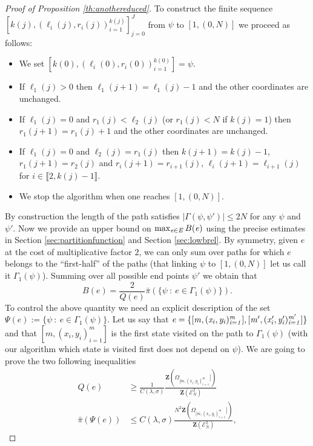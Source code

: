 \documentclass[reqno,11pt]{amsart}
\numberwithin{equation}{section}
\newcommand{\gG}{\Gamma}
\newcommand{\gO}{\Omega}
\newcommand{\gl}{\lambda}
\newcommand{\gs}{\sigma}
\newcommand{\cE}{{\ensuremath{\mathcal E}} }
\newcommand{\bZ}{{\ensuremath{\mathbf Z}} }
\newcommand{\lint}{\llbracket}
\newcommand{\rint}{\rrbracket}
\begin{document}
\begin{proof}[Proof of Proposition \ref{th:anothereduced}]
\medskip

To construct the finite sequence  $[k(j), (\ell_i(j),r_i(j))_{i=1}^{k(j)}]_{j=0}^{J}$ from $\psi$ to $[1,(0,N)]$ we proceed as follows:
\begin{itemize}
\item We set $[k(0), (\ell_i(0),r_i(0))^{k(0)}_{i=1}]= \psi$.
 \item If $\ell_1(j)>0$ then $\ell_1(j+1)= \ell_1(j)-1$ and the other coordinates are unchanged.
 \item If $\ell_1(j)=0$ and $r_1(j)<\ell_2(j)$ (or $r_1(j)<N$ if $k(j)=1$) then $r_1(j+1)=r_1(j)+1$ and the other coordinates are unchanged.
 \item If $\ell_1(j)=0$ and $\ell_2(j)=r_1(j)$ then $k(j+1)=k(j)-1$, $r_1(j+1)=r_2(j)$
 and $r_{i}(j+1)=r_{i+1}(j)$,  $\ell_{i}(j+1)=\ell_{i+1}(j)$ for $i \in \lint 2, k(j)-1\rint$.
 \item We stop the algorithm when one reaches $[1,(0,N)]$.
\end{itemize}
By construction the length of the path satisfies $| \gG(\psi,\psi') |\le 2N$ for any $\psi$ and $\psi'$.
Now we provide an upper bound on $\max_{\it e \in \it E} B(\it e)$ using the precise estimates in Section \ref{sec:partitionfunction} and Section \ref{sec:lowbrel}. By symmetry, given $e$ at the cost of  multiplicative factor $2$, we can only sum over paths for which $e$ belongs to the ``first-half'' of the paths (that linking $\psi$ to  $[1,(0,N)]$ let us call it $\gG_1(\psi)$).
Summing over all possible end points  $\psi'$  we obtain that 
\begin{equation}
 B(e)= \frac{2}{Q(e)} \bar \pi \left( \{\psi  \ :  \ e \in \Gamma_1(\psi)\} \right).
\end{equation}
To control the above quantity we need an explicit description of the set $\Psi(e):=\{\psi  \ :  \ e \in \Gamma_1(\psi)\}$.
Let us say that 
 $\it e= \{[m, (x_i,y_i)^m_{i=1}], [m', (x'_i,y'_i)^{m'}_{i=1}]\}$
 and that $[m, (x_i,y_i)^m_{i=1}]$ is the first state visited on the path to $\gG_1(\psi)$ (with our algorithm which state is visited first does not depend on $\psi$).
We are going to prove the two following inequalities
\begin{equation}\begin{split}\label{2stimz}
 Q(e) &\ge \frac{1}{C(\gl, \gs)} \frac{\bZ(\gO_{[m, (x_i,y_i)^m_{i=1}}])}{\bZ(\cE_N^2)} \\    
 \bar \pi \left( \Psi(e) \right)&
 \le  C(\gl, \gs) \frac{N^2\bZ(\gO_{[m, (x_i,y_i)^m_{i=1}}])}{\bZ(\cE_N^2)} ,
\end{split}\end{equation}

\end{proof}
\end{document}
